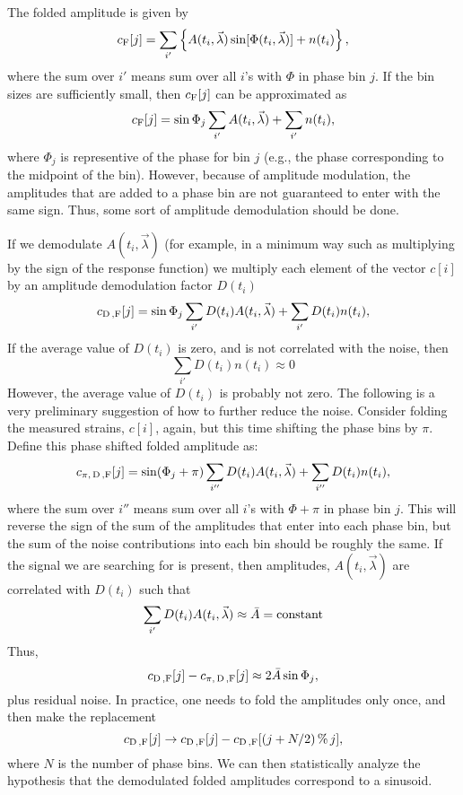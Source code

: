 The folded amplitude is given by
$$
c_{\rm F} [j] = \sum_{i'}
\left \{ A(t_i,\vec{\lambda})\sin[\Phi(t_i,\vec{\lambda})] + n(t_i) \right \} ,
$$
where the sum over $i'$ means sum over all $i$'s with $\Phi$ in phase bin $j$.
If the bin sizes are sufficiently small, then $c_{\rm F} [j]$ can be approximated as
$$
c_{\rm F} [j] = \sin\Phi_j\sum_{i'} A(t_i,\vec{\lambda}) + \sum_{i'} n(t_i) ,
$$
where $\Phi_j$ is representive of the phase for bin $j$ (e.g., the phase corresponding to the midpoint of the bin).
However, because of amplitude modulation, the amplitudes that are added to a phase bin are not guaranteed to enter
with the same sign.  Thus, some sort of amplitude demodulation should be done.

If we demodulate $A(t_i,\vec{\lambda})$ (for example, in a minimum way such as multiplying by the sign
of the response function) we multiply each element of the vector $c[i]$ by an amplitude demodulation factor $D(t_i)$
$$
c_{\rm D\, , F} [j] = \sin\Phi_j \sum_{i'} D(t_i) A(t_i,\vec{\lambda}) + \sum_{i'} D(t_i) n(t_i) ,
$$
If the average value of $D(t_i)$ is zero, and is not correlated with the noise, then
$$
\sum_{i'} D(t_i) n(t_i) \approx 0
$$
However, the average value of $D(t_i)$ is probably not zero.
The following is a very preliminary suggestion of how to further reduce the noise.
Consider folding the measured strains, $c[i]$, again,
but this time shifting the phase bins by $\pi$.  Define this phase shifted folded amplitude as:
$$
c_{\pi, \, \rm D\, , F} [j] = \sin(\Phi_j + \pi) \sum_{i''} D(t_i) A(t_i,\vec{\lambda}) + \sum_{i''} D(t_i) n(t_i) ,
$$
where the sum over $i''$ means sum over all $i$'s with $\Phi + \pi$ in phase bin $j$.
This will reverse the sign of the sum of the amplitudes that enter into each phase bin, but
the sum of the noise contributions into each bin should be roughly the same.
If the signal we are searching for is present, then amplitudes, $A(t_i,\vec{\lambda})$ are correlated with $D(t_i)$ such that
$$
\sum_{i'} D(t_i) A(t_i,\vec{\lambda}) \approx \bar{A} = {\rm constant}
$$
Thus,
$$
c_{\rm D\, , F} [j] - c_{\pi, \, \rm D\, , F} [j] \approx 2 \bar{A}\sin\Phi_j ,
$$
plus residual noise.  In practice, one needs to fold the amplitudes only once, and then make the replacement
$$
c_{\rm D\, , F} [j] \rightarrow c_{\rm D\, , F} [j] - c_{\rm D\, , F} [(j + N/2) \, \% \, j] ,
$$
where $N$ is the number of phase bins.  We can then statistically analyze the hypothesis that
the demodulated folded amplitudes correspond to a sinusoid.

\newpage

